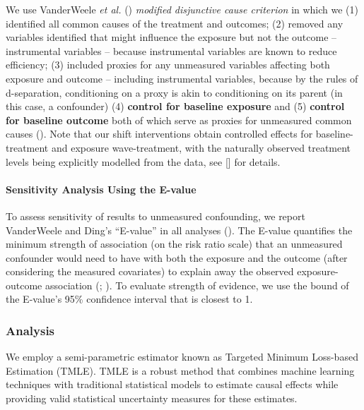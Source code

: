 \documentclass[
  singlecolumn]{article}
\let\oldparagraph\paragraph
\renewcommand{\paragraph}[1]{\oldparagraph{#1}\mbox{}}
\begin{document}
We use VanderWeele \emph{et al.} ()
\emph{modified disjunctive cause criterion} in which we (1) identified
all common causes of the treatment and outcomes; (2) removed any
variables identified that might influence the exposure but not the
outcome -- instrumental variables -- because instrumental variables are
known to reduce efficiency; (3) included proxies for any unmeasured
variables affecting both exposure and outcome -- including instrumental
variables, because by the rules of d-separation, conditioning on a proxy
is akin to conditioning on its parent (in this case, a confounder) (4)
\textbf{control for baseline exposure} and (5) \textbf{control for
baseline outcome} both of which serve as proxies for unmeasured common
causes ().
Note that our shift interventions obtain controlled effects for
baseline-treatment and exposure wave-treatment, with the naturally
observed treatment levels being explicitly modelled from the data, see
{[}{]} for details.

\paragraph{Sensitivity Analysis Using the
E-value}\label{sensitivity-analysis-using-the-e-value}

To assess sensitivity of results to unmeasured confounding, we report
VanderWeele and Ding's ``E-value'' in all analyses
(). The E-value
quantifies the minimum strength of association (on the risk ratio scale)
that an unmeasured confounder would need to have with both the exposure
and the outcome (after considering the measured covariates) to explain
away the observed exposure-outcome association
(;
). To
evaluate strength of evidence, we use the bound of the E-value's 95\%
confidence interval that is closest to 1.

\subsubsection{Analysis}\label{analysis}

We employ a semi-parametric estimator known as Targeted Minimum
Loss-based Estimation (TMLE). TMLE is a robust method that combines
machine learning techniques with traditional statistical models to
estimate causal effects while providing valid statistical uncertainty
measures for these estimates.
\end{document}

